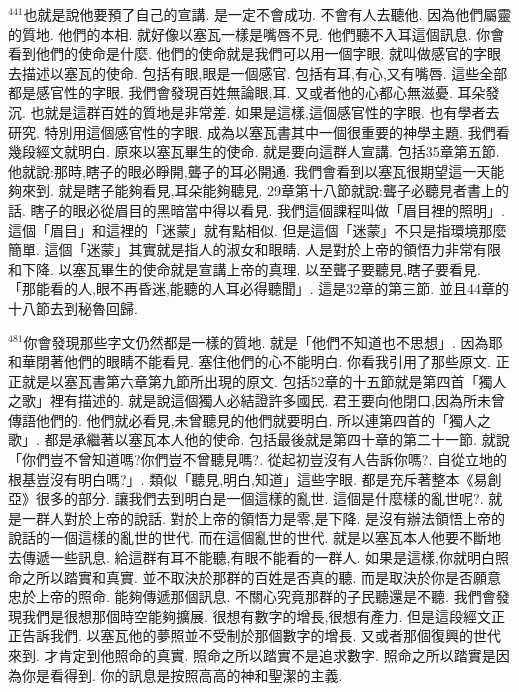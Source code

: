 \documentclass{book}
\begin{document}
$^{441}$也就是說他要預了自己的宣講.
是一定不會成功.
不會有人去聽他.
因為他們屬靈的質地.
他們的本相.
就好像以塞瓦一樣是嘴唇不見.
他們聽不入耳這個訊息.
你會看到他們的使命是什麼.
他們的使命就是我們可以用一個字眼.
就叫做感官的字眼去描述以塞瓦的使命.
包括有眼,眼是一個感官.
包括有耳,有心,又有嘴唇.
這些全部都是感官性的字眼.
我們會發現百姓無論眼,耳.
又或者他的心都心無滋憂.
耳朵發沉.
也就是這群百姓的質地是非常差.
如果是這樣,這個感官性的字眼.
也有學者去研究.
特別用這個感官性的字眼.
成為以塞瓦書其中一個很重要的神學主題.
我們看幾段經文就明白.
原來以塞瓦畢生的使命.
就是要向這群人宣講.
包括35章第五節.
他就說:那時,瞎子的眼必睜開,聾子的耳必開通.
我們會看到以塞瓦很期望這一天能夠來到.
就是瞎子能夠看見,耳朵能夠聽見.
29章第十八節就說:聾子必聽見者書上的話.
瞎子的眼必從眉目的黑暗當中得以看見.
我們這個課程叫做「眉目裡的照明」.
這個「眉目」和這裡的「迷蒙」就有點相似.
但是這個「迷蒙」不只是指環境那麼簡單.
這個「迷蒙」其實就是指人的淑女和眼睛.
人是對於上帝的領悟力非常有限和下降.
以塞瓦畢生的使命就是宣講上帝的真理.
以至聾子要聽見,瞎子要看見.
「那能看的人,眼不再昏迷,能聽的人耳必得聽聞」.
這是32章的第三節.
並且44章的十八節去到秘魯回歸.

$^{481}$你會發現那些字文仍然都是一樣的質地.
就是「他們不知道也不思想」.
因為耶和華閉著他們的眼睛不能看見.
塞住他們的心不能明白.
你看我引用了那些原文.
正正就是以塞瓦書第六章第九節所出現的原文.
包括52章的十五節就是第四首「獨人之歌」裡有描述的.
就是說這個獨人必結證許多國民.
君王要向他閉口,因為所未曾傳語他們的.
他們就必看見,未曾聽見的他們就要明白.
所以連第四首的「獨人之歌」.
都是承繼著以塞瓦本人他的使命.
包括最後就是第四十章的第二十一節.
就說「你們豈不曾知道嗎?你們豈不曾聽見嗎?.
從起初豈沒有人告訴你嗎?.
自從立地的根基豈沒有明白嗎?」.
類似「聽見,明白,知道」這些字眼.
都是充斥著整本《易創亞》很多的部分.
讓我們去到明白是一個這樣的亂世.
這個是什麼樣的亂世呢?.
就是一群人對於上帝的說話.
對於上帝的領悟力是零,是下降.
是沒有辦法領悟上帝的說話的一個這樣的亂世的世代.
而在這個亂世的世代.
就是以塞瓦本人他要不斷地去傳遞一些訊息.
給這群有耳不能聽,有眼不能看的一群人.
如果是這樣,你就明白照命之所以踏實和真實.
並不取決於那群的百姓是否真的聽.
而是取決於你是否願意忠於上帝的照命.
能夠傳遞那個訊息.
不關心究竟那群的子民聽還是不聽.
我們會發現我們是很想那個時空能夠擴展.
很想有數字的增長,很想有產力.
但是這段經文正正告訴我們.
以塞瓦他的夢照並不受制於那個數字的增長.
又或者那個復興的世代來到.
才肯定到他照命的真實.
照命之所以踏實不是追求數字.
照命之所以踏實是因為你是看得到.
你的訊息是按照高高的神和聖潔的主義.
\end{document}
